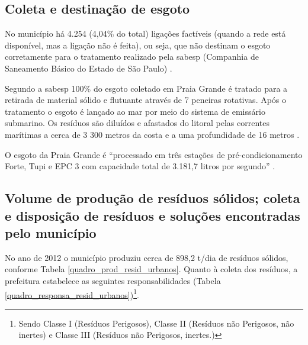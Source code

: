 	\subsection{Coleta e destinação de esgoto}
	
	No município há 4.254 (4,04\% do total) ligações factíveis (quando a rede está disponível, mas a ligação não é feita), ou seja, que não destinam o esgoto corretamente para o tratamento realizado pela \gls{sabesp} (Companhia de Saneamento Básico do Estado de São Paulo) \cite{Rossi2017a}.
	
	Segundo a \gls{sabesp} 100\% do esgoto coletado em Praia Grande é tratado para a retirada de material sólido e flutuante através de 7 peneiras rotativas. Após o tratamento o esgoto é lançado ao mar por meio do sistema de emissário submarino. Os resíduos são diluídos e afastados do litoral pelas correntes marítimas a cerca de 3 300 metros da costa e a uma profundidade de 16 metros \cite{Carvalho2014a}.
	
	O esgoto da Praia Grande é ``processado em três estações de pré-condicionamento \textemdash Forte, Tupi e EPC 3 \textemdash com capacidade total de 3.181,7 litros por segundo'' \cite{Sabesp2017a}.
	
	\subsection{Volume de produção de resíduos sólidos; coleta e disposição de resíduos e soluções encontradas pelo município}
	
	No ano de 2012 o município produziu cerca de 898,2 t/dia de resíduos sólidos, conforme Tabela \ref{quadro_prod_resid_urbanos}. Quanto à coleta dos resíduos, a prefeitura estabelece as seguintes responsabilidades (Tabela \ref{quadro_responsa_resid_urbanos})\footnote{Sendo Classe I (Resíduos Perigosos), Classe II (Resíduos não Perigosos, não inertes) e Classe III (Resíduos não Perigosos, inertes.)}.
	
